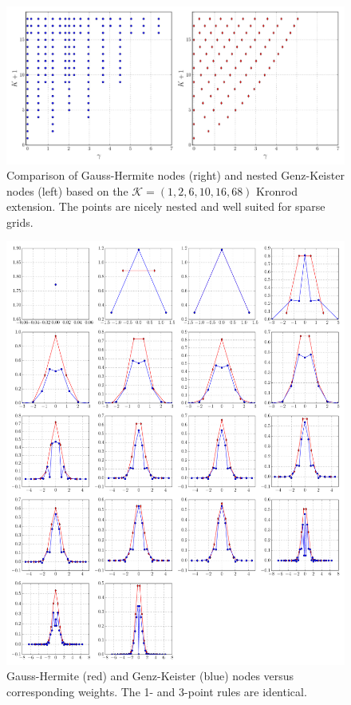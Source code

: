\documentclass[a4paper,10pt]{article}
\begin{document}
\begin{figure}[h]
  \centering
  \includegraphics[width=\linewidth]{./img/gk_hermitephy_nodes_cmp.pdf}
  \caption{Comparison of Gauss-Hermite nodes (right) and nested Genz-Keister nodes (left)
  based on the $\mathcal{K} = (1, 2, 6, 10, 16, 68)$ Kronrod extension. The points are
  nicely nested and well suited for sparse grids.}
  \label{fig:gk_hermitephy_nodes_cmp}
\end{figure}

\begin{figure}[h]
  \centering
  \includegraphics[width=\linewidth]{./img/gk_hermitephy_nodes_1d.pdf}
  \caption{Gauss-Hermite (red) and Genz-Keister (blue) nodes versus
  corresponding weights. The 1- and 3-point rules are identical.}
  \label{fig:gk_hermitephy_nodes_1d}
\end{figure}
\end{document}
